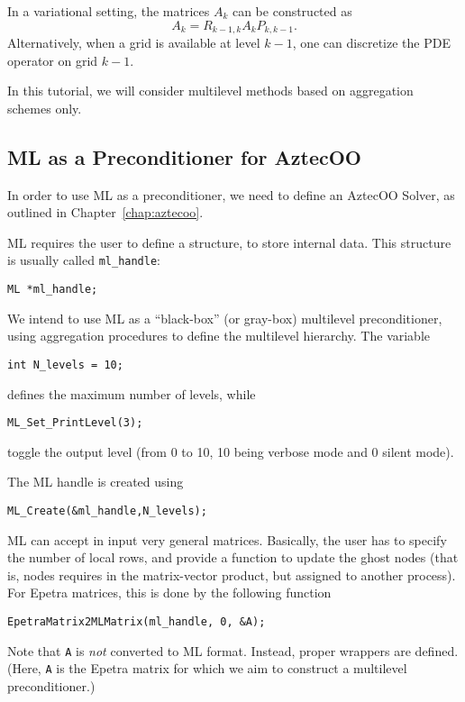 In a variational setting, the matrices $A_k$ can be constructed as
\[
A_k = R_{k-1,k} A_k P_{k,k-1}.
\]
Alternatively, when a grid is available at level $k-1$, one can
discretize the PDE operator on grid $k-1$.

\begin{remark}
  In this tutorial, we will consider multilevel methods based on
  aggregation schemes only.
\end{remark}


\subsection{ML as a Preconditioner for AztecOO}
\label{sec:ml_prec}

In order to use ML as a preconditioner, we need to define an
AztecOO Solver, as outlined in Chapter~\ref{chap:aztecoo}. 

ML requires the user to define a structure, to store internal data. This
structure is usually called \verb!ml_handle!:
\begin{verbatim}
ML *ml_handle;
\end{verbatim}

We intend to use ML as a ``black-box'' (or gray-box) multilevel
preconditioner, using aggregation procedures to define the multilevel
hierarchy. The variable
\begin{verbatim}
int N_levels = 10;
\end{verbatim}
defines the maximum number of levels, while
\begin{verbatim}
ML_Set_PrintLevel(3);
\end{verbatim}
toggle the output level (from 0 to 10, 10 being verbose mode and 0
silent mode).

The ML handle is created using
\begin{verbatim}
ML_Create(&ml_handle,N_levels);
\end{verbatim}
ML can accept in input very general matrices. Basically, the user has to
specify the number of local rows, and provide a function to update the
ghost nodes (that is, nodes requires in the matrix-vector product, but
assigned to another process). For Epetra matrices, this is done by the
following function
\begin{verbatim}
EpetraMatrix2MLMatrix(ml_handle, 0, &A);
\end{verbatim}
Note that \verb!A! is {\sl not} converted to ML format. Instead, proper
wrappers are defined.  (Here, \verb!A! is the Epetra matrix for which we
aim to construct a multilevel preconditioner.)

